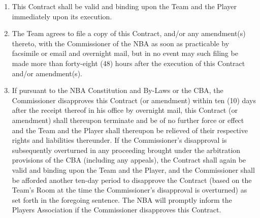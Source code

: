 \documentclass[
]{book}
\providecommand{\tightlist}{%
  \setlength{\itemsep}{0pt}\setlength{\parskip}{0pt}}
\begin{document}
\begin{enumerate}
\def\labelenumi{(\alph{enumi})}
\tightlist
\item
  This Contract shall be valid and binding upon the Team and the Player immediately upon its execution.
\item
  The Team agrees to file a copy of this Contract, and/or any amendment(s) thereto, with the Commissioner of the NBA as soon as practicable by facsimile or email and overnight mail, but in no event may such filing be made more than forty-eight (48) hours after the execution of this Contract and/or amendment(s).
\item
  If pursuant to the NBA Constitution and By-Laws or the CBA, the Commissioner disapproves this Contract (or amendment) within ten (10) days after the receipt thereof in his office by overnight mail, this Contract (or amendment) shall thereupon terminate and be of no further force or effect and the Team and the Player shall thereupon be relieved of their respective rights and liabilities thereunder. If the Commissioner's disapproval is subsequently overturned in any proceeding brought under the arbitration provisions of the CBA (including any appeals), the Contract shall again be valid and binding upon the Team and the Player, and the Commissioner shall be afforded another ten-day period to disapprove the Contract (based on the Team's Room at the time the Commissioner's disapproval is overturned) as set forth in the foregoing sentence. The NBA will promptly inform the Players Association if the Commissioner disapproves this Contract.
\end{enumerate}
\end{document}
